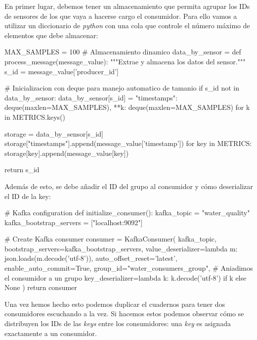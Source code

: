 \documentclass[
	a4paper, %
	12pt, %
]{CSSullivanBusinessReport}
\begin{document}
En primer lugar, debemos tener un almacenamiento que permita agrupar los IDs de sensores de los que vaya a hacerse cargo el consumidor. Para ello vamos a utilizar un diccionario de \textit{python} con una cola que controle el número máximo de elementos que debe almacenar:

\begin{vscodePython}
MAX_SAMPLES = 100
# Almacenamiento dinamico
data_by_sensor = {}
def process_message(message_value):
    """Extrae y almacena los datos del sensor."""
    s_id = message_value['producer_id']
    
    # Inicializacion con deque para manejo automatico de tamanio
    if s_id not in data_by_sensor:
        data_by_sensor[s_id] = {
            "timestamps": deque(maxlen=MAX_SAMPLES),
            **{k: deque(maxlen=MAX_SAMPLES) for k in METRICS.keys()}
        }
    
    storage = data_by_sensor[s_id]
    storage["timestamps"].append(message_value['timestamp'])
    for key in METRICS:
        storage[key].append(message_value[key])
    
    return s_id
\end{vscodePython}

Además de esto, se debe añadir el ID del grupo al consumidor y cómo deserializar el ID de la key:
\begin{vscodePython}
    # Kafka configuration
def initialize_consumer():
    kafka_topic = "water_quality"
    kafka_bootstrap_servers = ["localhost:9092"]

    # Create Kafka consumer
    consumer = KafkaConsumer(
        kafka_topic,
        bootstrap_servers=kafka_bootstrap_servers,
        value_deserializer=lambda m: json.loads(m.decode('utf-8')),
        auto_offset_reset='latest',
        enable_auto_commit=True,
        group_id="water_consumers_group",   # Aniadimos el consumidor a un grupo
        key_deserializer=lambda k: k.decode('utf-8') if k else None
    )
    return consumer
\end{vscodePython}

Una vez hemos hecho esto podemos duplicar el cuadernos para tener dos consumidores escuchando a la vez. Si hacemos estos podemos observar cómo se distribuyen los IDs de las \textit{keys} entre los consumidores: una \textit{key} es asignada exactamente a un consumidor.
\end{document}
